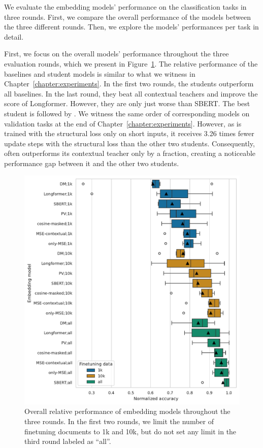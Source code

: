 We evaluate the embedding models' performance on the classification tasks in
three rounds. First, we compare the overall performance of the models between
the three different rounds. Then, we explore the models' performances per task
in detail.

First, we focus on the overall models' performance throughout the three
evaluation rounds, which we present in Figure~\ref{fig:final_eval_norm_all}.
The relative performance of the baselines and student models is similar to what
we witness in Chapter~\ref{chapter:experiments}. In the first two rounds, the
students outperform all baselines. In the last round, they beat all contextual
teachers and improve the score of Longformer. However, they are only just worse
than SBERT. The best student is {\OnlyMSEStudent} followed by {\MSEStudent}. We
witness the same order of corresponding models on validation tasks at the end
of Chapter~\ref{chapter:experiments}. However, as {\CosineStudent} is trained
with the structural loss only on short inputs, it receives 3.26 times fewer
update steps with the structural loss than the other two students.
Consequently, {\CosineStudent} often outperforms its contextual teacher only by
a fraction, creating a noticeable performance gap between it and the other two
students.

\begin{figure}

  \includegraphics[width=\textwidth]{img/final_eval_norm_all.pdf}

  \caption{Overall relative performance of embedding models throughout the three
  rounds. In the first two rounds, we limit the number of finetuning documents to 1k
  and 10k, but do not set any limit in the third round labeled as ``all''.}

  \label{fig:final_eval_norm_all}

\end{figure}

